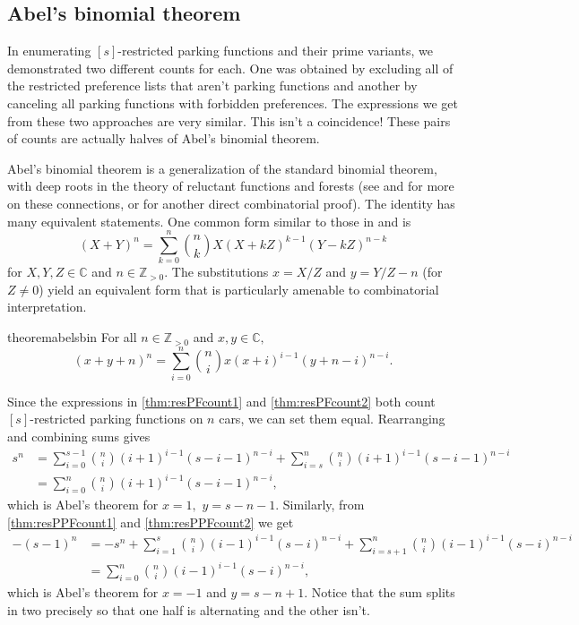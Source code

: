 \documentclass[12 pt]{amsart}
\theoremstyle{definition} %
\theoremstyle{remark} %
\begin{document}
\subsection{Abel's binomial theorem} \label{sec:abelsbin}

In enumerating $[s]$-restricted parking functions and their prime variants, we demonstrated two different counts for each. One was obtained by excluding all of the restricted preference lists that aren't parking functions and another by canceling all parking functions with forbidden preferences. The expressions we get from these two approaches are very similar. This isn't a coincidence! These pairs of counts are actually halves of Abel's binomial theorem.

Abel's binomial theorem is a generalization of the standard binomial theorem, with deep roots in the theory of reluctant functions and forests (see \cite{shapiro-1991} and \cite{pitman-2002} for more on these connections, or \cite{francon-1974} for another direct combinatorial proof). The identity has many equivalent statements. One common form similar to those in \cite{shapiro-1991} and \cite{zucker-2024} is
\[
	(X + Y)^{n} = \sum_{k = 0}^{n} \binom{n}{k} X (X + kZ)^{k - 1} (Y - k Z)^{n - k}
\]
for $X, Y, Z \in \mathbb{C}$ and $n \in \mathbb{Z}_{> 0}$. The substitutions $x = X/Z$ and $y = Y/Z - n$ (for $Z \neq 0$) yield an equivalent form that is particularly amenable to combinatorial interpretation.

\begin{restatable}{theorem}{abelsbin}
	For all $n\in\mathbb{Z}_{>0}$ and $x,y\in\mathbb{C},$
    \[
		(x + y + n)^{n} = \sum_{i = 0}^{n} \binom{n}{i} x (x + i)^{i - 1} (y + n - i)^{n - i}.
	\]
\end{restatable}

Since the expressions in \cref{thm:resPFcount1} and \cref{thm:resPFcount2} both count $[s]$-restricted parking functions on $n$ cars, we can set them equal. Rearranging and combining sums gives
\begin{align*}
    s^{n} &= \sum_{i = 0}^{s - 1} \binom{n}{i} (i + 1)^{i - 1} (s - i - 1)^{n - i} + \sum_{i = s}^{n} \binom{n}{i} (i + 1)^{i - 1} (s - i - 1)^{n - i}\\
    &=\sum_{i = 0}^{n} \binom{n}{i} (i + 1)^{i - 1} (s - i - 1)^{n - i},
\end{align*}
which is Abel's theorem for $x=1,$ $y=s-n-1.$ Similarly, from \cref{thm:resPPFcount1} and \cref{thm:resPPFcount2} we get 
\begin{align*}
    - (s - 1)^{n} &= -s^n + \sum_{i = 1}^{s} \binom{n}{i} (i - 1)^{i - 1} (s - i)^{n - i} + \sum_{i = s + 1}^{n} \binom{n}{i} (i - 1)^{i - 1} (s - i)^{n - i}\\
    &=\sum_{i=0}^n \binom{n}{i} (i - 1)^{i - 1} (s - i)^{n - i},
\end{align*}
which is Abel's theorem for $x=-1$ and $y=s-n+1$. Notice that the sum splits in two precisely so that one half is alternating and the other isn't.
\end{document}
